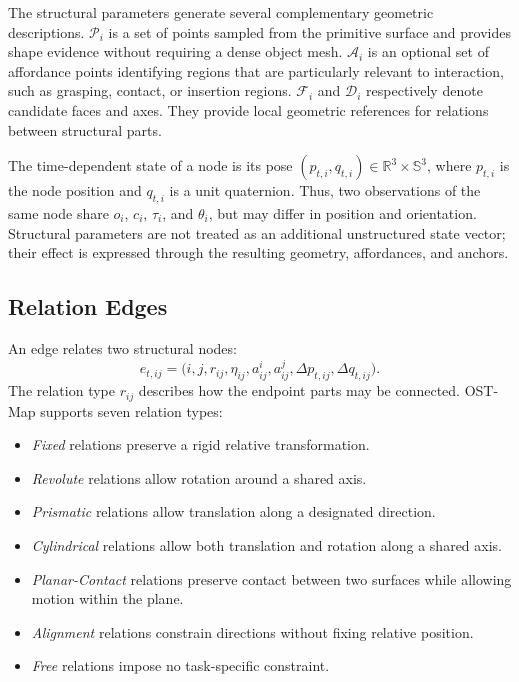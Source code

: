 The structural parameters generate several complementary geometric
descriptions. $\mathcal{P}_i$ is a set of points sampled from the primitive
surface and provides shape evidence without requiring a dense object mesh.
$\mathcal{A}_i$ is an optional set of affordance points identifying regions
that are particularly relevant to interaction, such as grasping, contact, or
insertion regions. $\mathcal{F}_i$ and $\mathcal{D}_i$ respectively denote
candidate faces and axes. They provide local geometric references for
relations between structural parts.

The time-dependent state of a node is its pose
$(p_{t,i},q_{t,i})\in\mathbb{R}^{3}\times\mathbb{S}^{3}$, where $p_{t,i}$ is
the node position and $q_{t,i}$ is a unit quaternion. Thus, two observations
of the same node share $o_i$, $c_i$, $\tau_i$, and $\theta_i$, but may differ
in position and orientation. Structural parameters are not treated as an
additional unstructured state vector; their effect is expressed through the
resulting geometry, affordances, and anchors.

\subsection{Relation Edges}
\label{app:ost_map_edges}

An edge relates two structural nodes:
\begin{equation}
    e_{t,ij}
    =
    \bigl(
    i,j,
    r_{ij},
    \eta_{ij},
    a_{ij}^{i},
    a_{ij}^{j},
    \Delta p_{t,ij},
    \Delta q_{t,ij}
    \bigr).
    \label{eq:ost_map_edge_full}
\end{equation}
The relation type $r_{ij}$ describes how the endpoint parts may be connected.
OST-Map supports seven relation types:
\begin{itemize}
    \item \textit{Fixed} relations preserve a rigid relative transformation.
    \item \textit{Revolute} relations allow rotation around a shared axis.
    \item \textit{Prismatic} relations allow translation along a designated
    direction.
    \item \textit{Cylindrical} relations allow both translation and rotation
    along a shared axis.
    \item \textit{Planar-Contact} relations preserve contact between two
    surfaces while allowing motion within the plane.
    \item \textit{Alignment} relations constrain directions without fixing
    relative position.
    \item \textit{Free} relations impose no task-specific constraint.
\end{itemize}

